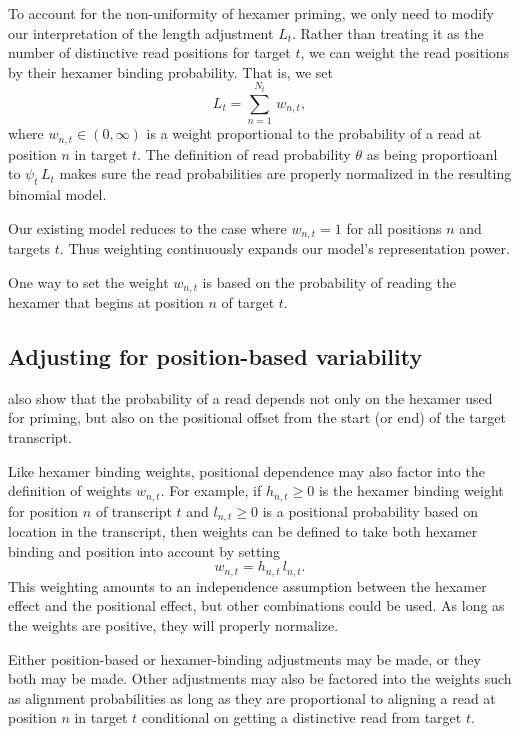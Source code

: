 \documentclass[11pt]{report}
\begin{document}
To account for the non-uniformity of hexamer priming, we only need to
modify our interpretation of the length adjustment $L_t$.
Rather than treating it as the number of distinctive read positions
for target $t$, we can weight the read positions by their hexamer
binding probability.  That is, we set
\[
  L_t = \sum_{n = 1}^{N_t} \, w_{n,t},
\]
where $w_{n,t} \in (0, \infty)$ is a weight proportional to the
probability of a read at position $n$ in target $t$.  The definition
of read probability $\theta$ as being proportioanl to $\psi_t \, L_t$
makes sure the read probabilities are properly normalized in the
resulting binomial model.

Our existing model reduces to the case where $w_{n,t} = 1$ for all
positions $n$ and targets $t$.  Thus weighting continuously expands
our model's representation power.

One way to set the weight $w_{n,t}$ is based on the probability of
reading  the hexamer that begins at position $n$ of target $t$.

\subsection{Adjusting for position-based variability}

\cite{roberts2011improving} also show that the probability of a read
depends not only on the hexamer used for priming, but also on the
positional offset from the start (or end) of the target transcript.

Like hexamer binding weights, positional dependence may also factor
into the definition of weights $w_{n, t}$.  For example, if
$h_{n, t} \geq 0$ is the hexamer binding weight for position $n$ of
transcript $t$ and $l_{n, t} \geq 0$ is a positional probability based
on location in the transcript, then weights can be defined to take
both hexamer binding and position into account by setting
\[
  w_{n, t} = h_{n, t} \, l_{n, t}.
\]
This weighting amounts to an independence assumption between the
hexamer effect and the positional effect, but other combinations could
be used.  As long as the weights are positive, they will properly
normalize.

Either position-based or hexamer-binding adjustments may be made, or
they both may be made.  Other adjustments may also be factored into
the weights such as alignment probabilities as long as they are
proportional to aligning a read at position $n$ in target $t$
conditional on getting a distinctive read from target $t$.
\end{document}
